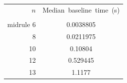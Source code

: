 \begin{tabular}{rc}
\toprule
$n$ & Median~baseline~time~(s) \\ \\midrule
6 & 0.0038805 \\ 
8 & 0.0211975 \\ 
10 & 0.10804 \\ 
12 & 0.529445 \\ 
13 & 1.1177 \\ 
\bottomrule
\end{tabular}
